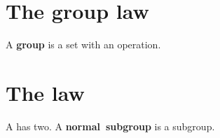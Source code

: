 \documentclass{article}
\newcommand{\term}[1]{\textbf{#1}}
\begin{document}
\tableofcontents
\section{The \term{group} law}
A \term{group} is a set with an operation.
\section{The  law}
A  has two.
A \term{normal~subgroup} is a subgroup.
\end{document}
